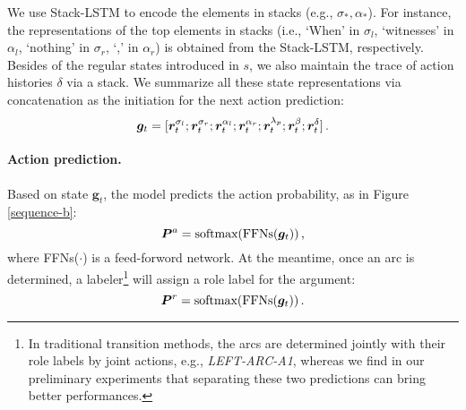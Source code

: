 \documentclass[letterpaper]{article} \usepackage{aaai21}  \usepackage{times}  \usepackage{helvet} \usepackage{courier}  \usepackage[hyphens]{url}  \usepackage{graphicx} \urlstyle{rm} \def\UrlFont{\rm}  \usepackage{natbib}  \usepackage{caption}
\begin{document}
\begin{CJK}{UTF8}{gbsn}
We use Stack-LSTM \cite{ZhangQZLJ19,YuanJT19} to encode the elements in stacks (e.g., $\sigma_{*}, \alpha_{*}$).
For instance, the representations of the top elements in stacks (i.e., `When' in $\sigma_{l}$, `witnesses' in $\alpha_{l}$, `nothing' in $\sigma_{r}$, `,' in $\alpha_{r}$) is obtained from the Stack-LSTM, respectively.
Besides of the regular states introduced in $s$, we also maintain the trace of action histories $\delta$ via a stack.
We summarize all these state representations via concatenation as the initiation for the next action prediction: 
\begin{equation}
\setlength\abovedisplayskip{2pt}
\setlength\belowdisplayskip{2pt}
\bm{g}_t = [\bm{r}^{\sigma_l}_t;\bm{r}^{\sigma_r}_t;\bm{r}^{\alpha_l}_t;\bm{r}^{\alpha_r}_t;\bm{r}^{\lambda_p}_t;\bm{r}^{\beta}_t;\bm{r}^{\delta}_t] \,.
\end{equation}



\paragraph{Action prediction.}
Based on state $\bm{g}_t$, the model predicts the action probability, as in Figure \ref{sequence-b}:
\begin{equation} \label{label_score}
\setlength\abovedisplayskip{2pt}
\setlength\belowdisplayskip{2pt}
\bm{P}^{a} = \text{softmax}(\text{FFNs}(\bm{g}_t)) \,,
\end{equation}
where FFNs($\cdot$) is a feed-forword network.
At the meantime, once an arc is determined,
a labeler\footnote{
In traditional transition methods, the arcs are determined jointly with their role labels by joint actions, e.g., \emph{LEFT-ARC-A1}, whereas we find in our preliminary experiments that separating these two predictions can bring better performances.
}
will assign a role label for the argument:
\begin{equation} \label{role_score}
\setlength\abovedisplayskip{2pt}
\setlength\belowdisplayskip{2pt}
\bm{P}^{r} = \text{softmax}(\text{FFNs}(\bm{g}_t)) \,.
\end{equation}







\end{CJK}
\end{document}
